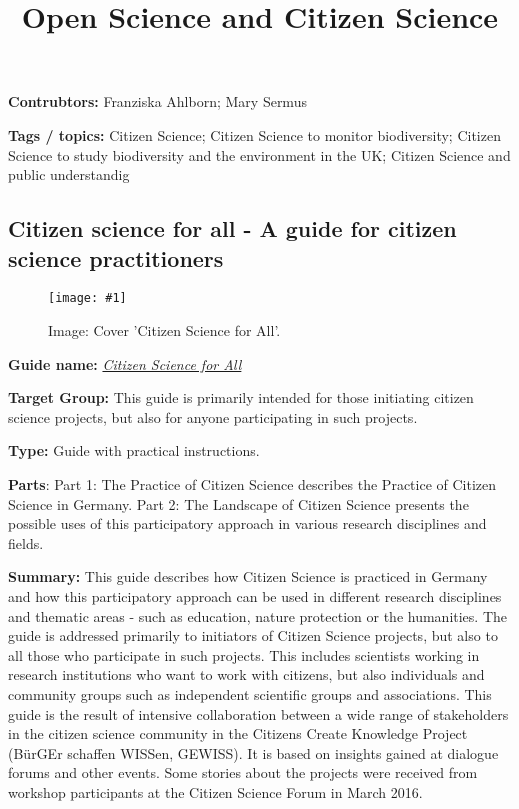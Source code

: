 \documentclass{article}
\newlength{\imgwidth}
\newcommand\scaledgraphics[2]{%
                
\settowidth{\imgwidth}{\texttt{[image: \#1]}}%
                
\setlength{\imgwidth}{\minof{\imgwidth}{#2\textwidth}}%
                
\texttt{[image: \#1]}%
                
}
\begin{document}
\title{Open Science and Citizen Science}

\maketitle


\textbf{Contrubtors:} Franziska Ahlborn; Mary Sermus


\textbf{Tags / topics:} Citizen Science; Citizen Science to monitor biodiversity; Citizen Science to study biodiversity and the environment in the UK; Citizen Science and public understandig


\subsection{Citizen science for all - A guide for citizen science practitioners}\label{H2662301}



\begin{center}
\begin{figure}
\scaledgraphics{3cbbd8ed-7495-46a8-8cb5-114cf95cfb83.png}{0.75}
\caption*{Image: Cover 'Citizen Science for All'.}\label{F38618731}
\end{figure}


\end{center}


\textbf{Guide name:} \emph{\href{https://www.buergerschaffenwissen.de/sites/default/files/grid/2017/11/20/handreichunga5_engl_web.pdf}{Citizen Science for All}} \autocite{noauthor_citizen_2016}


\textbf{Target Group: }This guide is primarily intended for those initiating citizen science projects, but also for anyone participating in such projects.


\textbf{Type: }Guide with practical instructions.


\textbf{Parts}:  Part 1: The Practice of Citizen Science describes the Practice of Citizen Science in Germany. Part 2: The Landscape of Citizen Science presents the possible uses of this participatory approach in various research disciplines and fields.


\textbf{Summary: }This guide describes how Citizen Science is practiced in Germany and how this participatory approach can be used in different research disciplines and thematic areas - such as education, nature protection or the humanities. The guide is addressed primarily to initiators of Citizen Science projects, but also to all those who participate in such projects. This includes scientists working in research institutions who want to work with citizens, but also individuals and community groups such as independent scientific groups and associations. This guide is the result of intensive collaboration between a wide range of stakeholders in the citizen science community in the Citizens Create Knowledge Project (BürGEr schaffen WISSen, GEWISS). It is based on insights gained at dialogue forums and other events. Some stories about the projects were received from workshop participants at the Citizen Science Forum in March 2016.
\end{document}
